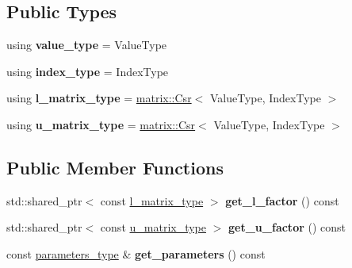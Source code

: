 \subsection*{Public Types}
\begin{DoxyCompactItemize}
\item 
\mbox{\label{classgko_1_1factorization_1_1ParIlu_acad8911da0088ca766a1cef155e5e405}} 
using {\bfseries value\+\_\+type} = Value\+Type
\item 
\mbox{\label{classgko_1_1factorization_1_1ParIlu_a261e5d91114bf308e98fc50141615618}} 
using {\bfseries index\+\_\+type} = Index\+Type
\item 
\mbox{\label{classgko_1_1factorization_1_1ParIlu_a125b96d5b1c81df5b2dd4479d8eb7854}} 
using {\bfseries l\+\_\+matrix\+\_\+type} = \hyperlink{classgko_1_1matrix_1_1Csr}{matrix\+::\+Csr}$<$ Value\+Type, Index\+Type $>$
\item 
\mbox{\label{classgko_1_1factorization_1_1ParIlu_a42829761e1a7a7713cbace50a8197811}} 
using {\bfseries u\+\_\+matrix\+\_\+type} = \hyperlink{classgko_1_1matrix_1_1Csr}{matrix\+::\+Csr}$<$ Value\+Type, Index\+Type $>$
\end{DoxyCompactItemize}
\subsection*{Public Member Functions}
\begin{DoxyCompactItemize}
\item 
\mbox{\label{classgko_1_1factorization_1_1ParIlu_a237f590d6f802b732936b6da20dae86c}} 
std\+::shared\+\_\+ptr$<$ const \hyperlink{classgko_1_1matrix_1_1Csr}{l\+\_\+matrix\+\_\+type} $>$ {\bfseries get\+\_\+l\+\_\+factor} () const
\item 
\mbox{\label{classgko_1_1factorization_1_1ParIlu_a75d0504d863b0dc2a8fd8efa395b2a39}} 
std\+::shared\+\_\+ptr$<$ const \hyperlink{classgko_1_1matrix_1_1Csr}{u\+\_\+matrix\+\_\+type} $>$ {\bfseries get\+\_\+u\+\_\+factor} () const
\item 
\mbox{\label{classgko_1_1factorization_1_1ParIlu_a1055caaa79b253fad67fa4e6d584c420}} 
const \hyperlink{structgko_1_1factorization_1_1ParIlu_1_1parameters__type}{parameters\+\_\+type} \& {\bfseries get\+\_\+parameters} () const
\end{DoxyCompactItemize}
